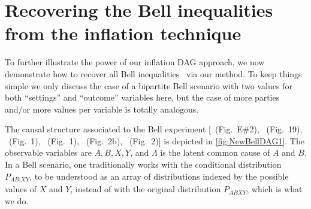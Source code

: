 {\section{Recovering the Bell inequalities from the inflation technique}
\label{sec:Bellscenarios}


To further illustrate the power of our inflation DAG approach, we now demonstrate how to recover all Bell inequalities~\cite{Brunner2013Bell,bell1966lhvm,CHSHOriginal} via our method. To keep things simple we only discuss the case of a bipartite Bell scenario with two values for both ``settings'' and ``outcome'' variables here, but the case of more parties and/or more values per variable is totally analogous.

The causal structure associated to the Bell \cite{bell1964einstein,Brunner2013Bell,bell1966lhvm,CHSHOriginal} experiment [\citealp{pusey2014gdag}~(Fig.~E\#2), \citealp{WoodSpekkens}~(Fig.~19), \citealp{chaves2014novel}~(Fig.~1), \citealp{BeyondBellII}~(Fig.~1), \citealp{wolfe2015nonconvexity}~(Fig.~2b), \citealp{steeg2011relaxation}~(Fig.~2)] is depicted in \cref{fig:NewBellDAG1}. The observable variables are $A,B,X,Y$, and $\Lambda$ is the latent common cause of $A$ and $B$. In a Bell scenario, one traditionally works with the conditional distribution $P_{AB|XY}$, to be understood as an array of distributions indexed by the possible values of $X$ and $Y$, instead of with the original distribution $P_{ABXY}$, which is what we do.

}
